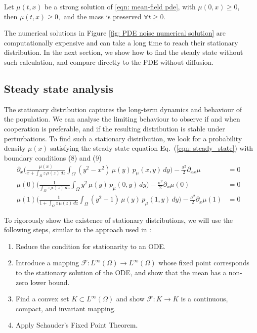 \documentclass[10pt]{article}
\begin{document}
\begin{proposition}\label{prop: pde properties}
    Let $\mu(t,x)$ be a strong solution of \eqref{eqn: mean-field pde}, with $\mu(0,x) \geq 0$, then $\mu(t,x) \geq 0,$ and the mass is preserved $\forall t \geq 0$.  
\end{proposition}

The numerical solutions in Figure \ref{fig: PDE noise numerical solution} are computationally expensive and can take a long time to reach their stationary distribution. In the next section, we show how to find the steady state without such calculation, and compare directly to the PDE without diffusion.

\subsection{Steady state analysis}

The stationary distribution captures the long-term dynamics and behaviour of the population. We can analyse the limiting behaviour to observe if and when cooperation is preferable, and if the resulting distribution is stable under perturbations. To find such a stationary distribution, we look for a probability density $\mu(x)$ satisfying the steady state equation Eq.~(\ref{eqn: steady_state}) with boundary conditions (8) and (9)
\begin{subequations}\label{eqn: steady_state}
\begin{align}
    \partial_x\Bigg( \frac{\mu(x)}{x+\int_{\Omega} z\,\mu(z)\,dz} \int_{\Omega} (y^2-x^2)\,\mu(y)\,p_\mu(x,y)\,dy\Bigg) - \frac{\sigma^2}{2}\partial_{xx}\mu &= 0\\
    \mu(0)\Bigg( \frac{1}{\int_{\Omega} z\,\mu(z)\,dz} \int_{\Omega} y^2\,\mu(y)\,p_\mu(0,y)\,dy\Bigg) - \frac{\sigma^2}{2}\partial_{x}\mu(0) &= 0\\
    \mu(1)\Bigg( \frac{1}{1+\int_{\Omega} z\,\mu(z)\,dz} \int_{\Omega} (y^2-1)\,\mu(y)\,p_\mu(1,y)\,dy\Bigg) - \frac{\sigma^2}{2}\partial_{x}\mu(1) &= 0
\end{align}
\end{subequations}

To rigorously show the existence of stationary distributions, we will use the following steps, similar to the approach used in \cite{nugent_opinion_2025}:
\begin{enumerate}
    \item Reduce the condition for stationarity to an ODE.
    \item Introduce a mapping $\mathcal{F}:L^\infty(\Omega) \rightarrow L^\infty(\Omega)$ whose fixed point corresponds to the stationary solution of the ODE, and show that the mean has a non-zero lower bound. 
    \item Find a convex set $K \subset L^\infty(\Omega)$ and show $\mathcal{F}: K \rightarrow K$ is a continuous, compact, and invariant mapping.
    \item Apply Schauder's Fixed Point Theorem. 
\end{enumerate}
\end{document}
